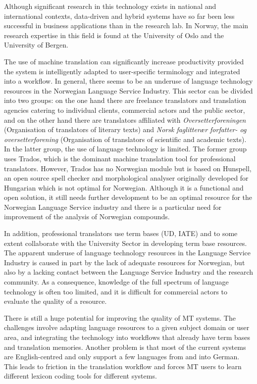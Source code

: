 \begin{multicols}{2}
Although significant research in this technology exists in national and international contexts, data-driven and hybrid systems have so far been less successful in business applications than in the research lab. 
In Norway, the main research expertise in this field is found at the University of Oslo and the University of Bergen.


The use of machine translation can significantly increase productivity provided the system is intelligently adapted to user-specific terminology and integrated into a workflow. 
In general, there seems to be an underuse of language technology resources in the Norwegian Language Service Industry. 
This sector can be divided into two groups: on the one hand there are freelance translators and translation agencies catering to individual clients, commercial actors and the public sector, and on the other hand there are translators affiliated with \textit{Oversetterforeningen} (Organisation of translators of literary texts) and \textit{Norsk faglitterær forfatter- og oversetterforening} (Organisation of translators of scientific and academic texts). In the latter group, the use of language technology is limited. 
The former group uses Trados, which is the dominant machine translation tool for professional translators. 
However, Trados has no Norwegian module but is based on Hunspell, an open source spell checker and morphological analyser originally developed for Hungarian which is not optimal for Norwegian. 
Although it is a functional and open solution, it still needs further development to be an optimal resource for the Norwegian Language Service industry and there is a particular need for improvement of the analysis of Norwegian compounds. 

In addition, professional translators use term bases (UD, IATE) and to some extent collaborate with the University Sector in developing term base resources. 
The apparent underuse of language technology resources in the Language Service Industry is caused in part by the lack of adequate resources for Norwegian, but also by a lacking contact between the Language Service Industry and the research community. 
As a consequence, knowledge of the full spectrum of language technology is often too limited, and it is difficult for commercial actors to evaluate the quality of a resource. 

There is still a huge potential for improving the quality of MT systems. The challenges involve adapting language resources to a given subject domain or user area, and integrating the technology into workflows that already have term bases and translation memories. Another problem is that most of the current systems are English-centred and only support a few languages from and into German. This leads to friction in the translation workflow and forces MT users to learn different lexicon coding tools for different systems.


\end{multicols}
